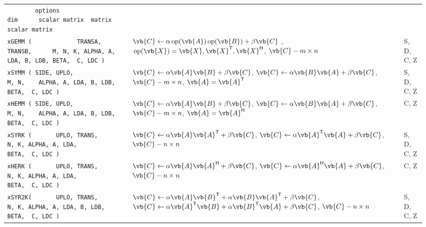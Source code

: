\documentclass[10pt,a3paper, landscape]{article}
\newcommand{\T}{\mathsf{T}}
\renewcommand{\H}{\mathsf{H}}
\renewcommand{\op}{\,\mathrm{op}}
\begin{document}
\begin{tabular}{lll}
		\verb|        options                          dim      scalar matrix  matrix  scalar matrix   | &                                                                                                                                                                                                                                                              &                    \\
		\verb|xGEMM (             TRANSA, TRANSB,      M, N, K, ALPHA, A, LDA, B, LDB, BETA,  C, LDC ) | & $\vb{C} \gets \alpha \op(\vb{A})\op(\vb{B})                             + \beta \vb{C} $                                                                    , $\op(\vb{X}) = \vb{X}, \vb{X}^{\T}, \vb{X}^{\H}$, $\vb{C} - m \times n$                        & S, D, C, Z         \\
		\verb|xSYMM ( SIDE, UPLO,                      M, N,    ALPHA, A, LDA, B, LDB, BETA,  C, LDC ) | & $\vb{C} \gets \alpha \vb{A}    \vb{B}                                 + \beta \vb{C} $, $\vb{C} \gets \alpha  \vb{B}   \vb{A}                                 + \beta \vb{C} $,                        $\vb{C} - m \times n$, $\vb{A}=\vb{A}^{\T}$           & S, D, C, Z         \\
		\verb|xHEMM ( SIDE, UPLO,                      M, N,    ALPHA, A, LDA, B, LDB, BETA,  C, LDC ) | & $\vb{C} \gets \alpha \vb{A}    \vb{B}                                 + \beta \vb{C} $, $\vb{C} \gets \alpha  \vb{B}   \vb{A}                                 + \beta \vb{C} $,                        $\vb{C} - m \times n$, $\vb{A}=\vb{A}^{\H}$           & C, Z               \\
		\verb|xSYRK (       UPLO, TRANS,                  N, K, ALPHA, A, LDA,         BETA,  C, LDC ) | & $\vb{C} \gets \alpha \vb{A}    \vb{A}^{\T}                               + \beta \vb{C} $, $\vb{C} \gets \alpha  \vb{A}^{\T} \vb{A}                                 + \beta \vb{C} $,                        $\vb{C} - n \times n$                           & S, D, C, Z         \\
		\verb|xHERK (       UPLO, TRANS,                  N, K, ALPHA, A, LDA,         BETA,  C, LDC ) | & $\vb{C} \gets \alpha \vb{A}    \vb{A}^{\H}                               + \beta \vb{C} $, $\vb{C} \gets \alpha  \vb{A}^{\H} \vb{A}                                 + \beta \vb{C} $,                        $\vb{C} - n \times n$                           & C, Z               \\
		\verb|xSYR2K(       UPLO, TRANS,                  N, K, ALPHA, A, LDA, B, LDB, BETA,  C, LDC ) | & $\vb{C} \gets \alpha \vb{A}    \vb{B}^{\T}      +       {\alpha} \vb{B} \vb{A}^{\T}   + \beta \vb{C} $, $\vb{C} \gets \alpha \vb{A}^{\T}    \vb{B}      +       {\alpha} \vb{B}^{\T} \vb{A}   + \beta \vb{C} $,                        $\vb{C} - n \times n$ & S, D, C, Z         \\

\end{tabular}
\end{document}
